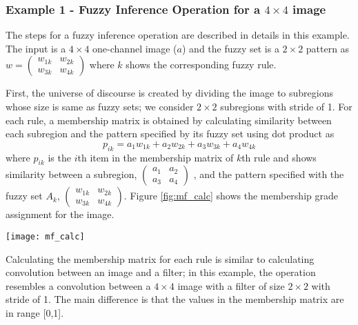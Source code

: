 \documentclass{article}
\begin{document}
\subsubsection{Example 1 - Fuzzy Inference Operation for a $4 \times 4$ image}

The steps for a fuzzy inference operation are described in details in this example. The input is a $4 \times 4$ one-channel image ($a$) and the fuzzy set is a $2 \times 2$ pattern as $w = \begin{pmatrix} w_{1k} & w_{2k}  \\  w_{3k} & w_{4k}  \end{pmatrix}$ where $k$ shows the corresponding fuzzy rule.


First, the universe of discourse is created by dividing the image to subregions whose size is same as fuzzy sets; we consider $2 \times 2$ subregions with stride of 1. For each rule, a membership matrix is obtained by calculating similarity between each subregion and the pattern specified by its fuzzy set using dot product as
\begin{equation} \label{eq:dot_proc}
p_{ik}=a_1w_{1k}+a_2w_{2k}+a_3w_{3k}+a_4w_{4k}
\end{equation}
where $p_{ik}$ is the $i$th item in the membership matrix of $k$th rule and shows similarity between a subregion,  $\begin{pmatrix} a_1 & a_2  \\  a_3 & a_4  \end{pmatrix}$ , and the pattern specified with the fuzzy set $A_k$,  $\begin{pmatrix} w_{1k} & w_{2k}  \\  w_{3k} & w_{4k}  \end{pmatrix}$. Figure \ref{fig:mf_calc} shows the membership grade assignment for the image.

\begin{figure*}[ht]
\vskip 0.2in
\begin{center}
\centerline{\texttt{[image: mf\_calc]}}
\caption{Membership matrix calculation}
\label{fig:mf_calc}
\end{center}
\vskip -0.2in
\end{figure*}


Calculating the membership matrix for each rule is similar to calculating convolution between an image and a filter; in this example, the operation resembles a convolution between a $4 \times 4$ image with a filter of size $2 \times 2$ with stride of 1. The main difference is that the values in the membership matrix are in range [0,1]. 
\end{document}
